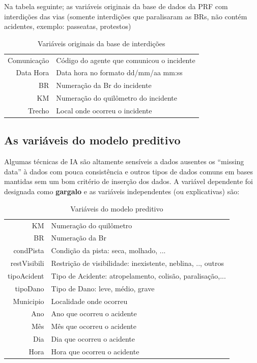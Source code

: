 \pagebreak

Na tabela seguinte; as variáveis originais da base de dados da PRF com interdições das vias 
(somente interdições que paralisaram as BRs, não contém acidentes, exemplo: passeatas, protestos) 

\begin{table}[htbp]
 \centering
  \caption{Variáveis originais da base de interdições}
  
  \begin{tabular}{r|l} \hline
   Comunicação & Código do agente que comunicou o incidente \\
   Data Hora & Data hora no formato dd/mm/aa mm:ss \\
   BR & Numeração da Br do incidente\\
   KM & Numeração do quilômetro do incidente\\
   Trecho  & Local onde ocorreu o incidente \\
  \end{tabular}
\end{table}



\subsection{ As variáveis do modelo preditivo}

Algumas técnicas de IA são altamente sensíveis a dados ausentes os ``missing data'' à dados com pouca consistência e outros tipos de dados 
comuns em bases mantidas sem um bom critério de inserção dos dados. 
A variável dependente foi designada como \textbf{gargalo} e as variáveis independentes (ou explicativas) são:


\begin{table}[htbp]
 \centering
  \caption{Variáveis do modelo preditivo}
  
  \begin{tabular}{r|l} \hline
   KM & Numeração do quilômetro \\
   BR & Numeração da Br\\
   condPista & Condição da pista: seca, molhado, ... \\
   restVisibili & Restrição de visibilidade: inexistente, neblina, .., outros \\
   tipoAcident & Tipo de Acidente: atropelamento, colisão, paralisação,...\\
   tipoDano  & Tipo de Dano: leve, médio, grave \\
   Municipio  & Localidade onde ocorreu \\
   Ano & Ano que ocorreu o acidente \\
   Mês & Mês que ocorreu o acidente \\
   Dia & Dia que ocorreu o acidente \\
   Hora & Hora que ocorreu o acidente \\
  \end{tabular}
\end{table}



